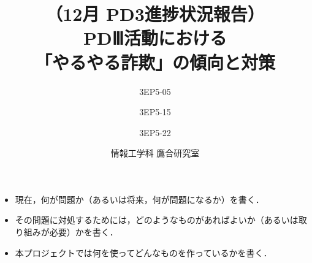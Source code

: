 


% 
%
\MyLogo{}

% 
%


\cfoot{\thepage/\pageref{LastPage}}

% 
%

\title{
{\large （12月 PD3進捗状況報告）}\\\vspace{10mm}
{\LARGE PDⅢ活動における\\「やるやる詐欺」の傾向と対策}
}
\date{情報工学科 鷹合研究室}
\author{
3EP5-05\\  \and
3EP5-15\\  \and 
3EP5-22\\ 
}




\maketitle %

\begin{itemize} 
 \item 現在，何が問題か（あるいは将来，何が問題になるか）を書く．
 \item その問題に対処するためには，どのようなものがあればよいか（あるいは取り組みが必要）かを書く．
 \item 本プロジェクトでは何を使ってどんなものを作っているかを書く．
\end{itemize}
\newpage


